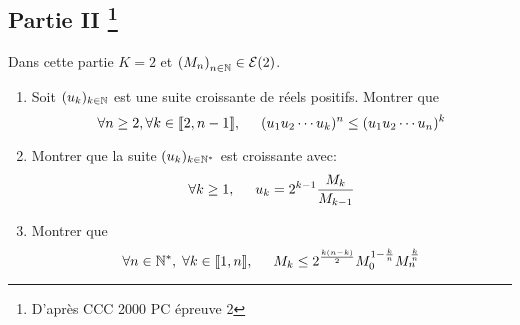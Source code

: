 \subsection*{Partie II \footnote{D'apr{\`e}s CCC 2000 PC {\'e}preuve 2}}
Dans cette partie $K=2$ et $\left( M_n\right)_{n\in \mathbb{N}}\in \mathcal{E}(2)$.
\begin{enumerate}
  \item Soit $(u_k)_{k\in\mathbb{N}}$ est une suite croissante de r{\'e}els positifs. Montrer que
\begin{displaymath}
\forall n \geq2, \forall k \in \llbracket 2, n-1 \rrbracket,\hspace{0.5cm}  (u_1 u_2 \cdots u_k)^n \leq (u_1 u_2 \cdots u_n)^k
\end{displaymath}

\item Montrer que la suite $(u_k)_{k\in\mathbb{N}^*}$ est croissante avec: 
\begin{displaymath}
\forall k \geq 1,\hspace{0.5cm} u_k = 2^{k-1}\frac{M_k}{M_{k-1}}  
\end{displaymath}

  \item Montrer que
\begin{displaymath}
\forall n \in \mathbb{N}^*, \; \forall k \in \llbracket 1,n \rrbracket, \hspace{0.5cm}  M_k \leq 2^{\frac{k(n-k)}{2}}M_0^{1-\frac{k}{n}}M_n^{\frac{k}{n}}
\end{displaymath}
\end{enumerate}


